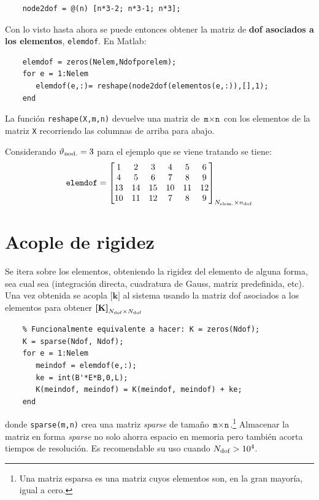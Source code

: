 \documentclass[11pt, a4paper,titlepage]{article}
\newcommand{\rmfont}[1]{{\fontfamily{ptm}\selectfont%
#1}}
\newcommand{\Matlab}{\rmfont{\sc Matlab}}
\newcommand{\Mme}[1]{\boldsymbol{[}\mathbf{#1} \boldsymbol{]}}
\newcommand{\MK}{\Mme{K}}
\newcommand{\Mk}{\Mme{k}}
\begin{document}
\begin{verbatim}
    node2dof = @(n) [n*3-2; n*3-1; n*3];
\end{verbatim}

Con lo visto hasta ahora se puede entonces obtener la matriz de \textbf{dof asociados a los elementos}, \texttt{elemdof}. En \Matlab{}:
\begin{verbatim}
    elemdof = zeros(Nelem,Ndofporelem);
    for e = 1:Nelem
       elemdof(e,:)= reshape(node2dof(elementos(e,:)),[],1);
    end
\end{verbatim}

La función \texttt{reshape(X,m,n)} devuelve una matriz de $\texttt{m}\times\texttt{n}$ con los elementos de la matriz \texttt{X} recorriendo las columnas de arriba para abajo.

Considerando $\vartheta_{\mathrm{nod.}}=3$ para el ejemplo que se viene tratando se tiene:
\begin{equation} \label{eq:MatrizElemdofEjemplo}
\texttt{elemdof} = \begin{bmatrix}
1 & 2 & 3 & 4 & 5 & 6 \\
4 & 5 & 6 & 7 & 8 & 9  \\
13 & 14 & 15 & 10 & 11 & 12 \\
10 & 11 & 12 & 7 & 8 & 9 
\end{bmatrix}_{ N_{\mathrm{elem.}} \times n_{\mathrm{dof}} } 
\end{equation}

\section{Acople de rigidez}
Se itera sobre los elementos, obteniendo la rigidez del elemento de alguna forma, sea cual sea (integración directa, cuadratura de Gauss, matriz predefinida, etc). Una vez obtenida se acopla $\Mk$ al sistema usando la matriz dof asociados a los elementos para obtener $\MK_{\Ndof \times \Ndof}$

\begin{verbatim}
    % Funcionalmente equivalente a hacer: K = zeros(Ndof);
    K = sparse(Ndof, Ndof); 
    for e = 1:Nelem
       meindof = elemdof(e,:);
       ke = int(B'*E*B,0,L);
       K(meindof, meindof) = K(meindof, meindof) + ke;
    end
\end{verbatim}
donde \texttt{sparse(m,n)} crea una matriz \textit{sparse} de tamaño $\texttt{m}\times\texttt{n}$.\footnote{Una matriz esparsa es una matriz cuyos elementos son, en la gran mayoría, igual a cero.} Almacenar la matriz en forma \textit{sparse} no solo ahorra espacio en memoria pero también acorta tiempos de resolución. Es recomendable su uso cuando $N_{\mathrm{dof}}>10^4$.
\end{document}
